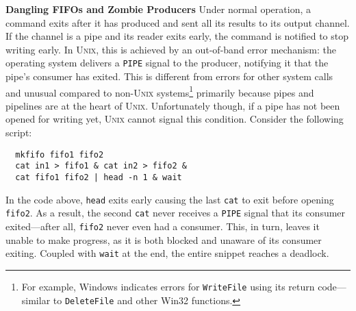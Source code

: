 \documentclass[sigplan, review, screen, anonymous]{acmart}
\newcommand{\heading}[1]{\vspace{4pt}\noindent\textbf{#1}\enspace}
\newcommand{\ttt}[1]{\texttt{#1}}
\newcommand{\TODO}[1]{\hl{\textbf{TODO:} #1}\xspace}
\newcommand{\nv}[1]{[{\color{cyan}nv: #1}]}
\newcommand{\kk}[1]{[{\color{magenta}kk: #1}]}
\newcommand{\sys}{{\scshape PaSh}\xspace}
\newcommand{\unix}{{\scshape Unix}\xspace}
\begin{document}
\heading{Dangling FIFOs and Zombie Producers}
%
%
Under normal operation, a command exits after it has produced and sent all its results to its output channel.
If the channel is a pipe and its reader exits early, the command is notified to stop writing early.
In \unix, this is achieved by an out-of-band error mechanism: the
operating system delivers a \ttt{PIPE} signal to the producer,
notifying it that the pipe's consumer has exited.  This is different
from errors for other system calls
and unusual compared to non-\unix systems\footnote{For example,
  Windows indicates errors for \ttt{WriteFile} using its return
  code---similar to \ttt{DeleteFile} and other Win32 functions.}
primarily because pipes and pipelines are at the heart of \unix.
Unfortunately though, if a pipe has not been opened for writing yet,
  \unix cannot signal this condition.
Consider the following script:
\begin{verbatim}
  mkfifo fifo1 fifo2
  cat in1 > fifo1 & cat in2 > fifo2 &
  cat fifo1 fifo2 | head -n 1 & wait
\end{verbatim}
\noindent
In the code above, \ttt{head} exits early causing the last \ttt{cat} to exit before opening \ttt{fifo2}.
As a result, the second \ttt{cat} never receives a \ttt{PIPE} signal that its consumer exited---after all, \ttt{fifo2} never even had a consumer.
This, in turn, leaves it unable to make progress, as it is both blocked and unaware of its consumer exiting.
Coupled with \ttt{wait} at the end, the entire snippet reaches a deadlock.
\end{document}
